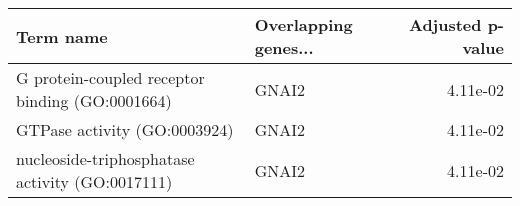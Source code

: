 \begin{tabular}{llr}
\toprule
                                      Term name & Overlapping genes... &  Adjusted p-value \\
\midrule
G protein-coupled receptor binding (GO:0001664) &                GNAI2 &          4.11e-02 \\
                   GTPase activity (GO:0003924) &                GNAI2 &          4.11e-02 \\
nucleoside-triphosphatase activity (GO:0017111) &                GNAI2 &          4.11e-02 \\
\bottomrule
\end{tabular}
